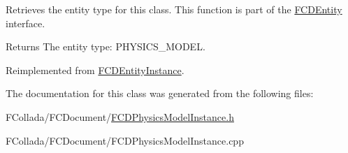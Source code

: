 \label{classFCDPhysicsModelInstance_a84476954bc4c90e663bf775db097b9fb}
Retrieves the entity type for this class. This function is part of the \hyperlink{classFCDEntity}{FCDEntity} interface. \begin{DoxyReturn}{Returns}
The entity type: PHYSICS\_\-MODEL. 
\end{DoxyReturn}


Reimplemented from \hyperlink{classFCDEntityInstance_a773c2cfdbad937e93da7a3fa71a671a7}{FCDEntityInstance}.



The documentation for this class was generated from the following files:\begin{DoxyCompactItemize}
\item 
FCollada/FCDocument/\hyperlink{FCDPhysicsModelInstance_8h}{FCDPhysicsModelInstance.h}\item 
FCollada/FCDocument/FCDPhysicsModelInstance.cpp\end{DoxyCompactItemize}
